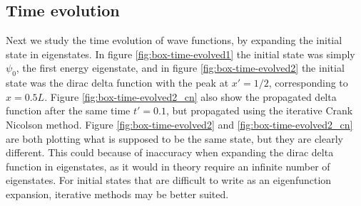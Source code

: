 \documentclass{article}
\begin{document}
\subsection{Time evolution}
Next we study the time evolution of wave functions, by expanding the initial state in eigenstates. In figure \ref{fig:box-time-evolved1} the initial state was simply $\psi_0$, the first energy eigenstate, and in figure \ref{fig:box-time-evolved2} the initial state was the dirac delta function with the peak at $x'=1/2$, corresponding to $x = 0.5L$. Figure \ref{fig:box-time-evolved2_cn} also show the propagated delta function after the same time $t' = 0.1$, but propagated using the iterative Crank Nicolson method. Figure \ref{fig:box-time-evolved2} and \ref{fig:box-time-evolved2_cn} are both plotting what is supposed to be the same state, but they are clearly different. This could because of inaccuracy when expanding the dirac delta function in eigenstates, as it would in theory require an infinite number of eigenstates. For initial states that are difficult to write as an eigenfunction expansion, iterative methods may be better suited.
\end{document}
